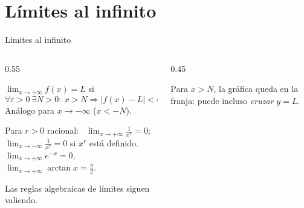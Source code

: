 \documentclass[10pt,aspectratio=169]{beamer}
\begin{document}
\section{Límites al infinito}

\begin{frame}{Límites al infinito}
  \begin{columns}
    \begin{column}{0.55\textwidth}
      \begin{definicion}
        $\displaystyle\lim_{x\to+\infty}f(x)=L$ si
        \[ \forall\varepsilon>0\ \exists N>0:\ x>N\Rightarrow|f(x)-L|<\varepsilon. \]
        Análogo para $x\to-\infty$ ($x<-N$).
      \end{definicion}
      \begin{teorema}
        Para $r>0$ racional: \ $\displaystyle\lim_{x\to+\infty}\frac1{x^r}=0$; \ $\lim_{x\to-\infty}\frac1{x^r}=0$ si $x^r$ está definido.
        \\ $\lim_{x\to+\infty}e^{-x}=0$, \ $\lim_{x\to+\infty}\arctan x=\frac\pi2$.
      \end{teorema}
      \small Las reglas algebraicas de límites siguen valiendo.
    \end{column}
    \begin{column}{0.45\textwidth}
      \centering

      \small Para $x>N$, la gráfica queda en la franja: puede incluso \emph{cruzar} $y=L$.
    \end{column}
  \end{columns}
\end{frame}
\end{document}
